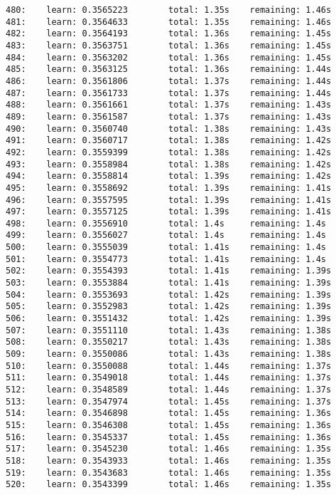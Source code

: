 \documentclass[11pt]{article}
\begin{document}
\begin{Verbatim}[commandchars=\\\{\}]
480:    learn: 0.3565223        total: 1.35s    remaining: 1.46s
481:    learn: 0.3564633        total: 1.35s    remaining: 1.46s
482:    learn: 0.3564193        total: 1.36s    remaining: 1.45s
483:    learn: 0.3563751        total: 1.36s    remaining: 1.45s
484:    learn: 0.3563202        total: 1.36s    remaining: 1.45s
485:    learn: 0.3563125        total: 1.36s    remaining: 1.44s
486:    learn: 0.3561806        total: 1.37s    remaining: 1.44s
487:    learn: 0.3561733        total: 1.37s    remaining: 1.44s
488:    learn: 0.3561661        total: 1.37s    remaining: 1.43s
489:    learn: 0.3561587        total: 1.37s    remaining: 1.43s
490:    learn: 0.3560740        total: 1.38s    remaining: 1.43s
491:    learn: 0.3560717        total: 1.38s    remaining: 1.42s
492:    learn: 0.3559399        total: 1.38s    remaining: 1.42s
493:    learn: 0.3558984        total: 1.38s    remaining: 1.42s
494:    learn: 0.3558814        total: 1.39s    remaining: 1.42s
495:    learn: 0.3558692        total: 1.39s    remaining: 1.41s
496:    learn: 0.3557595        total: 1.39s    remaining: 1.41s
497:    learn: 0.3557125        total: 1.39s    remaining: 1.41s
498:    learn: 0.3556910        total: 1.4s     remaining: 1.4s
499:    learn: 0.3556027        total: 1.4s     remaining: 1.4s
500:    learn: 0.3555039        total: 1.41s    remaining: 1.4s
501:    learn: 0.3554773        total: 1.41s    remaining: 1.4s
502:    learn: 0.3554393        total: 1.41s    remaining: 1.39s
503:    learn: 0.3553884        total: 1.41s    remaining: 1.39s
504:    learn: 0.3553693        total: 1.42s    remaining: 1.39s
505:    learn: 0.3552983        total: 1.42s    remaining: 1.39s
506:    learn: 0.3551432        total: 1.42s    remaining: 1.39s
507:    learn: 0.3551110        total: 1.43s    remaining: 1.38s
508:    learn: 0.3550217        total: 1.43s    remaining: 1.38s
509:    learn: 0.3550086        total: 1.43s    remaining: 1.38s
510:    learn: 0.3550088        total: 1.44s    remaining: 1.37s
511:    learn: 0.3549018        total: 1.44s    remaining: 1.37s
512:    learn: 0.3548589        total: 1.44s    remaining: 1.37s
513:    learn: 0.3547974        total: 1.45s    remaining: 1.37s
514:    learn: 0.3546898        total: 1.45s    remaining: 1.36s
515:    learn: 0.3546308        total: 1.45s    remaining: 1.36s
516:    learn: 0.3545337        total: 1.45s    remaining: 1.36s
517:    learn: 0.3545230        total: 1.46s    remaining: 1.35s
518:    learn: 0.3543933        total: 1.46s    remaining: 1.35s
519:    learn: 0.3543683        total: 1.46s    remaining: 1.35s
520:    learn: 0.3543399        total: 1.46s    remaining: 1.35s

\end{Verbatim}
\end{document}

